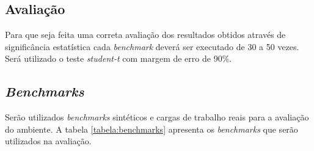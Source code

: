 \documentclass[10pt, conference, compsocconf]{IEEEtran}
\begin{document}
\subsection{Avaliação}
Para que seja feita uma correta avaliação dos resultados obtidos através de significância estatística cada \textit{benchmark} deverá ser executado de 30 a 50 vezes. Será utilizado o teste \textit{student-t} com margem de erro de 90\%.

\subsection{\textit{Benchmarks}}
Serão utilizados \textit{benchmarks} sintéticos e cargas de trabalho reais para a avaliação do ambiente. A tabela \ref{tabela:benchmarks} apresenta os \textit{benchmarks} que serão utilizados na avaliação.

\begin{table}[h!]
\centering
{}
\caption{\textit{Benchmarks} utilizados para a avaliação.}
\label{tabela:benchmarks}
\end{table}
\end{document}
